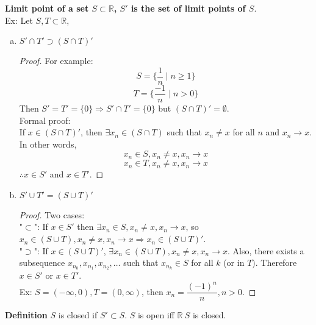 \documentclass[10pt,letterpaper]{article}
\begin{document}
	{\color{green}\textbf{Limit point of a set $S \subset \mathbb{R}$, $S'$ is the set of limit points of $S$}}. \\	
	Ex: Let $S, T \subset \mathbb{R}$,
	\begin{enumerate}[(a)]
	\item $S' \cap T' \supset (S \cap T)'$
	\begin{proof}
		For example:
		$$S = \{ \dfrac{1}{n} \mid n \geq 1 \}$$
		$$T = \{ \dfrac{-1}{n} \mid n > 0 \}$$
		Then $S' = T' = \{0\} \Rightarrow S' \cap T' = \{0\}$ but $(S \cap T)' = \emptyset$. \\
		Formal proof: \\
		If $x \in (S \cap T)'$, then $\exists x_n \in (S \cap T)$ such that $x_n \neq x$ for all $n$ 
		and $x_n \rightarrow x$. In other words,
		$$x_n \in S, x_n \neq x, x_n \rightarrow x$$
		$$x_n \in T, x_n \neq x, x_n \rightarrow x$$
		$\therefore x \in S'$ and $x \in T'$.
	\end{proof}
	
	\item $S' \cup T' = (S \cup T)'$ 
	\begin{proof} Two cases: \\
	"$\subset$": If $x \in S'$ then $\exists x_n \in S, x_n \neq x, x_n \rightarrow x$, so
	$x_n \in (S \cup T), x_n \neq x, x_n \rightarrow x \Rightarrow x_n \in (S \cup T)'$. \\
	"$\supset$": If $x \in (S \cup T)'$, $\exists x_n \in (S \cup T), x_n \neq x, x_n \rightarrow x$. 
	Also, there exists a subsequence $x_{n_0}, x_{n_1}, x_{n_2}, \ldots$ such that $x_{n_k} \in S$ for 
	all $k$ (or in $T$). Therefore $x \in S'$ or $x \in T'$. \\
	Ex: $S = (-\infty, 0), T = (0, \infty)$, then $x_n = \dfrac{(-1)^n}{n}, n > 0$.
	\end{proof}
	\end{enumerate}
	
	{\color{orange}\textbf{Definition } $S$ is closed if $S' \subset S$. $S$ is open iff 
	$\mathbb{R} \ S$ is closed.}
	
\end{document}
